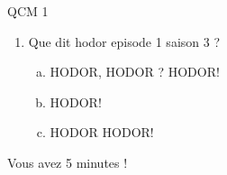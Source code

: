 \documentclass[a4paper, 11pt]{article}
\begin{document}
QCM 1\begin{enumerate}
			\item Que dit hodor episode 1 saison 3 ?
			\begin{enumerate} [a)]
				\item HODOR, HODOR ? HODOR!
				\item HODOR!
				\item HODOR HODOR!
			\end{enumerate}
		\vspace{5mm}
\end{enumerate}	
	Vous avez 5 minutes !
	
\end{document}

